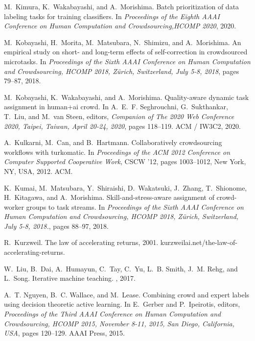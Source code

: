 \documentclass[11pt]{article}
\begin{document}
\begin{thebibliography}{10}
	M.~Kimura, K.~Wakabayashi, and A.~Morishima.
	\newblock Batch prioritization of data labeling tasks for training classifiers.
	\newblock In {\em Proceedings of the Eighth {AAAI} Conference on Human
		Computation and Crowdsourcing,HCOMP 2020}, 2020.
	
	M.~Kobayashi, H.~Morita, M.~Matsubara, N.~Shimizu, and A.~Morishima.
	\newblock An empirical study on short- and long-term effects of self-correction
	in crowdsourced microtasks.
	\newblock In {\em Proceedings of the Sixth {AAAI} Conference on Human
		Computation and Crowdsourcing, {HCOMP} 2018, Z{\"{u}}rich, Switzerland, July
		5-8, 2018}, pages 79--87, 2018.
	
	M.~Kobayashi, K.~Wakabayashi, and A.~Morishima.
	\newblock Quality-aware dynamic task assignment in human+ai crowd.
	\newblock In A.~E.~F. Seghrouchni, G.~Sukthankar, T.~Liu, and M.~van Steen,
	editors, {\em Companion of The 2020 Web Conference 2020, Taipei, Taiwan,
		April 20-24, 2020}, pages 118--119. {ACM} / {IW3C2}, 2020.
	
	A.~Kulkarni, M.~Can, and B.~Hartmann.
	\newblock Collaboratively crowdsourcing workflows with turkomatic.
	\newblock In {\em Proceedings of the ACM 2012 Conference on Computer Supported
		Cooperative Work}, CSCW '12, pages 1003--1012, New York, NY, USA, 2012. ACM.
	
	K.~Kumai, M.~Matsubara, Y.~Shiraishi, D.~Wakatsuki, J.~Zhang, T.~Shionome,
	H.~Kitagawa, and A.~Morishima.
	\newblock Skill-and-stress-aware assignment of crowd-worker groups to task
	streams.
	\newblock In {\em Proceedings of the Sixth {AAAI} Conference on Human
		Computation and Crowdsourcing, {HCOMP} 2018, Z{\"{u}}rich, Switzerland, July
		5-8, 2018.}, pages 88--97, 2018.
	
	R.~Kurzweil.
	\newblock The law of accelerating returns, 2001.
	\newblock kurzweilai.net/the-law-of-accelerating-returns.
	
	W.~Liu, B.~Dai, A.~Humayun, C.~Tay, C.~Yu, L.~B. Smith, J.~M. Rehg, and
	L.~Song.
	\newblock Iterative machine teaching.
	, 2017.
	
	A.~T. Nguyen, B.~C. Wallace, and M.~Lease.
	\newblock Combining crowd and expert labels using decision theoretic active
	learning.
	\newblock In E.~Gerber and P.~Ipeirotis, editors, {\em Proceedings of the Third
		{AAAI} Conference on Human Computation and Crowdsourcing, {HCOMP} 2015,
		November 8-11, 2015, San Diego, California, {USA}}, pages 120--129. {AAAI}
	Press, 2015.
	

\end{thebibliography}
\end{document}
